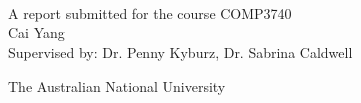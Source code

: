 \begin{titlepage}
  \enlargethispage{2cm}
  \begin{center}
    \makeatletter
    \Huge\textbf{\@title} \\[.4cm]
    \Huge\textbf{\thesisqualifier} \\[2.5cm]
    \huge\textbf{\@author} \\[9cm]
    \makeatother
    \LARGE A report submitted for the course COMP3740\\
    Cai Yang \\
    Supervised by: Dr. Penny Kyburz, Dr. Sabrina Caldwell
    
    The Australian National University \\[2cm]
    \thismonth


    
  \end{center}
\end{titlepage}
